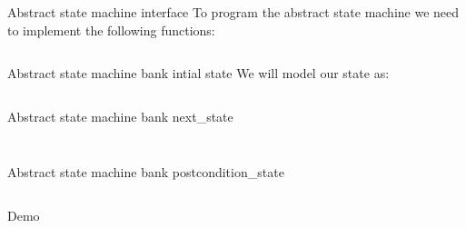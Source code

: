 \begin{frame}{Abstract state machine interface}
  To program the abstract state machine we need to implement the
  following functions:

  \inputminted{erlang}{./code/interface.erl}
\end{frame}

\begin{frame}{Abstract state machine bank intial state}
  We will model our state as:

  \inputminted{erlang}{./code/state.erl}
\end{frame}



\begin{frame}{Abstract state machine bank next\_state}
  \inputminted{erlang}{./code/next_model_state.erl}
\end{frame}

\begin{frame}
  \inputminted{erlang}{./code/next_model_state1.erl}
\end{frame}



\begin{frame}{Abstract state machine bank postcondition\_state}
  \inputminted{erlang}{./code/postcondition_model_state.erl}
\end{frame}

\begin{frame}{}{}
  \begin{center}
    \vspace{15pt}
    {\Huge Demo}
  \end{center}
\end{frame}